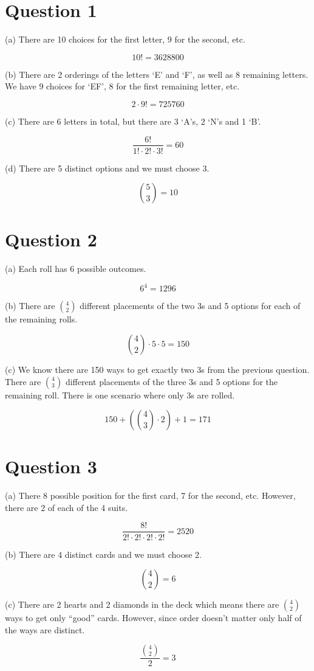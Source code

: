 \documentclass[12pt]{article}
\title{ST3009: Week #1 Assignment}
\author{Conor McCauley - 17323203}
\date{February 2, 2020}
\begin{document}
\maketitle

\section*{Question 1}

\noindent (a) There are 10 choices for the first letter, 9 for the second, etc.

$$ 10! = 3628800 $$

\noindent (b) There are 2 orderings of the letters `E' and `F', as well as 8 remaining letters. We have 9 choices for `EF', 8 for the first remaining letter, etc.

$$ 2 \cdot 9! = 725760 $$

\noindent (c) There are 6 letters in total, but there are 3 `A's, 2 `N's and 1 `B'.

$$ \frac{6!}{1! \cdot 2! \cdot 3!} = 60 $$

\noindent (d) There are 5 distinct options and we must choose 3.

$$ {5 \choose 3} = 10 $$

\section*{Question 2}

\noindent (a) Each roll has 6 possible outcomes.

$$ 6^4 = 1296 $$

\noindent (b) There are ${4 \choose 2}$ different placements of the two 3s and 5 options for each of the remaining rolls.

$$ {4 \choose 2} \cdot 5 \cdot 5 = 150 $$

\noindent (c) We know there are 150 ways to get exactly two 3s from the previous question. There are ${4 \choose 3}$ different placements of the three 3s and 5 options for the remaining roll. There is one scenario where only 3s are rolled.

$$ 150 + \left( {4 \choose 3} \cdot 2 \right) + 1 = 171$$

\section*{Question 3}

\noindent (a) There 8 possible position for the first card, 7 for the second, etc. However, there are 2 of each of the 4 suits.

$$ \frac{8!}{2! \cdot 2! \cdot 2! \cdot 2!} = 2520 $$

\noindent (b) There are 4 distinct cards and we must choose 2.

$$ {4 \choose 2} = 6 $$

\noindent (c) There are 2 hearts and 2 diamonds in the deck which means there are ${4 \choose 2}$ ways to get only ``good'' cards. However, since order doesn't matter only half of the ways are distinct.

$$ \frac{{4 \choose 2}}{2} = 3 $$
\end{document}
